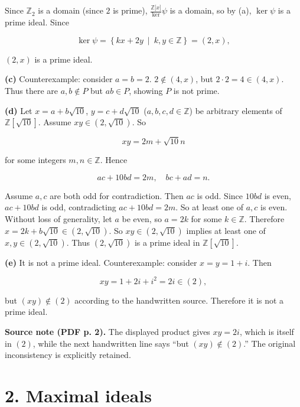 Since \(\mathbb{Z}_{2}\) is a domain (since \(2\) is prime), \(\frac{\mathbb{Z}\lbrack x\rbrack}{\ker}\psi\) is a domain, so by (a), \(\ker\psi\) is a prime ideal. Since

\[\ker\psi = \left\{ kx + 2y\  \middle| \ k,y \in \mathbb{Z} \right\} = \left( {2,x} \right),\]

\(\left( {2,x} \right)\) is a prime ideal.

\textbf{(c)} Counterexample: consider \(a = b = 2\). \(2 \notin \left( {4,x} \right)\), but \(2 \cdot 2 = 4 \in \left( {4,x} \right)\). Thus there are \(a,b \notin P\) but \(ab \in P\), showing \(P\) is not prime.

\textbf{(d)} Let \(x = a + b\sqrt{10}\), \(y = c + d\sqrt{10}\) (\(a,b,c,d \in \mathbb{Z}\)) be arbitrary elements of \(\mathbb{Z}\left\lbrack \sqrt{10} \right\rbrack\). Assume \(xy \in \left( {2,\sqrt{10}} \right)\). So

\[xy = 2m + \sqrt{10}n\]

for some integers \(m,n \in \mathbb{Z}\). Hence

\[ac + 10bd = 2m,\quad bc + ad = n.\]

Assume \(a,c\) are both odd for contradiction. Then \(ac\) is odd. Since \(10bd\) is even, \(ac + 10bd\) is odd, contradicting \(ac + 10bd = 2m\). So at least one of \(a,c\) is even. Without loss of generality, let \(a\) be even, so \(a = 2k\) for some \(k \in \mathbb{Z}\). Therefore \(x = 2k + b\sqrt{10} \in \left( {2,\sqrt{10}} \right)\). So \(xy \in \left( {2,\sqrt{10}} \right)\) implies at least one of \(x,y \in \left( {2,\sqrt{10}} \right)\). Thus \(\left( {2,\sqrt{10}} \right)\) is a prime ideal in \(\mathbb{Z}\left\lbrack \sqrt{10} \right\rbrack\).

\textbf{(e)} It is not a prime ideal. Counterexample: consider \(x = y = 1 + i\). Then

\[xy = 1 + 2i + i^{2} = 2i \in (2),\]

but \(\left( {xy} \right) \notin (2)\) according to the handwritten source. Therefore it is not a prime ideal.

{\textbf{Source note (PDF p. 2).} The displayed product gives \(xy = 2i\), which is itself in \((2)\), while the next handwritten line says ``but \(\left( {xy} \right) \notin (2)\).'' The original inconsistency is explicitly retained.}

\section{2. Maximal ideals}


